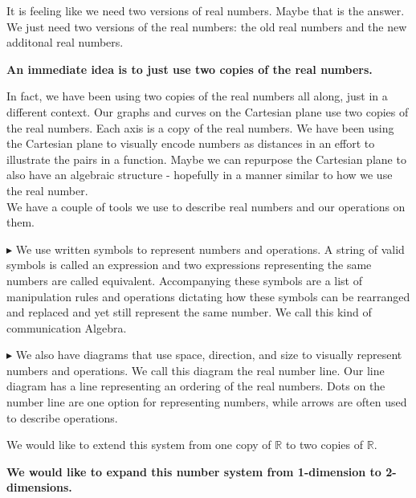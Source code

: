 \documentclass{ximera}
\begin{document}
It is feeling like we need two versions of real numbers. Maybe that is the answer. We just need two versions of the real numbers: the old real numbers and the new additonal real numbers.





\begin{center}
\textbf{\textcolor{purple!85!blue}{An immediate idea is to just use two copies of the real numbers.}}
\end{center}


In fact, we have been using two copies of the real numbers all along, just in a different context. Our graphs and curves on the Cartesian plane use two copies of the real numbers.  Each axis is a copy of the real numbers. We have been using the Cartesian plane to visually encode numbers as distances in an effort to illustrate the pairs in a function. Maybe we can repurpose the Cartesian plane to also have an algebraic structure - hopefully in a manner similar to how we use the real number. \\








We have a couple of tools we use to describe real numbers and our operations on them.


$\blacktriangleright$  We use written symbols to represent numbers and operations.  A string of valid symbols is called an expression and two expressions representing the same numbers are called equivalent. Accompanying these symbols are a list of manipulation rules and operations dictating how these symbols can be rearranged and replaced and yet still represent the same number.  We call this kind of communication Algebra.


$\blacktriangleright$  We also have diagrams that use space, direction, and size to visually represent numbers and operations. We call this diagram the real number line. Our line diagram has a line representing an ordering of the real numbers. Dots on the number line are one option for representing numbers, while arrows are often used to describe operations.


We would like to extend this system from one copy of \textbf{$\mathbb{R}$} to two copies of \textbf{$\mathbb{R}$}. \\



\begin{center}
\textbf{\textcolor{red!90!darkgray}{We would like to expand this number system from 1-dimension to 2-dimensions.}}
\end{center}
\end{document}

